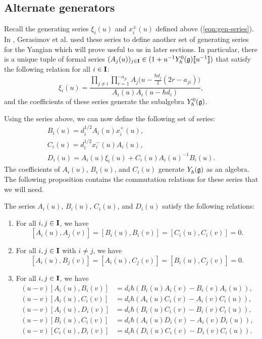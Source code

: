 \subsection{Alternate generators}

Recall the generating series $\xi_i(u)$ and $x^\pm_i(u)$ defined above (\ref{eqn:gen-series}).
In \cite{gerasimov_class_2005}, Gerasimov et al. used these series to define another set of generating series for the Yangian which will prove useful to us in later sections.
In particular, there is a unique tuple of formal series $(A_j(u))_{j\in\I}\in (1+u^{-1}\Yhg[0]\db{u^{-1}})$ that satisfy the following relation for all $i\in\I$:
\[\xi_i(u) = \frac{\prod\limits_{j\neq i}\prod\limits_{r=1}^{-a_{ji}}A_j\bigl(u-\frac{\hbar d_j}{2}(2r-a_{ji})\bigr)}{A_i(u)A_i(u-\hbar d_i)},\]
and the coefficients of these series generate the subalgebra $\Yhg[0]$.

Using the series above, we can now define the following set of series:
\begin{gather*}
    B_i(u) = d_i^{1/2}A_i(u)x^+_i(u), \\
    C_i(u) = d_i^{1/2}x^-_i(u)A_i(u), \\
    D_i(u) = A_i(u)\xi_i(u) + C_i(u)A_i(u)^{-1}B_i(u).
\end{gather*}
The coefficients of $A_i(u)$, $B_i(u)$, and $C_i(u)$ generate $\Yhg$ as an algebra.
The following proposition \cite[Prop. 2.1]{gerasimov_class_2005} contains the commutation relations for these series that we will need.

\begin{proposition}\label{P:GKLO}
    The series $A_i(u)$, $B_i(u)$, $C_i(u)$, and $D_i(u)$ satisfy the following relations:
    \begin{enumerate}
        \item For all $i,j\in\I$, we have
        \[[A_i(u),A_j(v)] = [B_i(u),B_i(v)] = [C_i(u),C_i(v)] = 0.\]
        \item For all $i,j\in\I$ with $i\neq j$, we have
        \[[A_i(u),B_j(v)] = [A_i(u),C_j(v)] = [B_i(u),C_j(v)] = 0.\]
        \item For all $i,j\in\I$, we have
        \begin{align*}
            (u-v)[A_i(u),B_i(v)] &= d_i\hbar(B_i(u)A_i(v) - B_i(v)A_i(u)), \\
            (u-v)[A_i(u),C_i(v)] &= d_i\hbar(A_i(u)C_i(v) - A_i(v)C_i(u)), \\
            (u-v)[A_i(u),D_i(v)] &= d_i\hbar(B_i(u)C_i(v) - B_i(v)C_i(u)), \\
            (u-v)[B_i(u),C_i(v)] &= d_i\hbar(A_i(u)D_i(v) - A_i(v)D_i(u)), \\
            (u-v)[C_i(u),D_i(v)] &= d_i\hbar(D_i(u)C_i(v) - D_i(v)C_i(u)).
        \end{align*}
    \end{enumerate}
\end{proposition}

